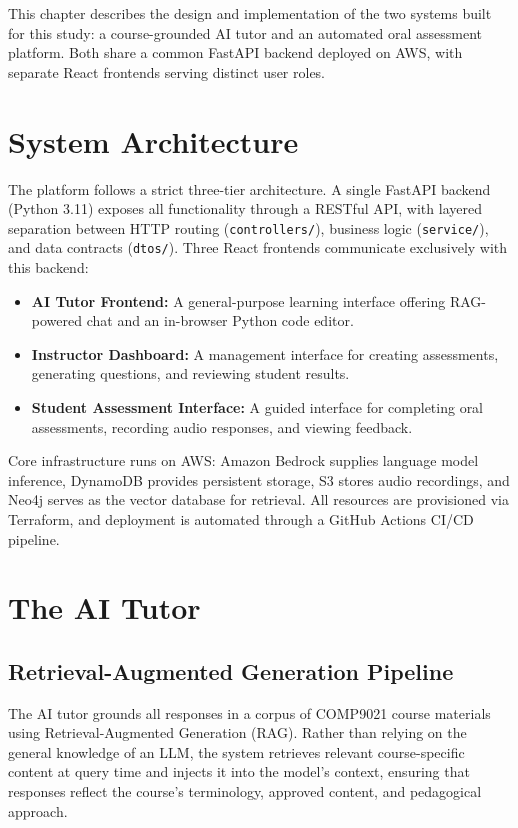 This chapter describes the design and implementation of the two systems built for this study: a course-grounded AI tutor and an automated oral assessment platform. Both share a common FastAPI backend deployed on AWS, with separate React frontends serving distinct user roles.

\section{System Architecture}

The platform follows a strict three-tier architecture. A single FastAPI backend (Python 3.11) exposes all functionality through a RESTful API, with layered separation between HTTP routing (\texttt{controllers/}), business logic (\texttt{service/}), and data contracts (\texttt{dtos/}). Three React frontends communicate exclusively with this backend:

\begin{itemize}
    \item \textbf{AI Tutor Frontend:} A general-purpose learning interface offering RAG-powered chat and an in-browser Python code editor.
    \item \textbf{Instructor Dashboard:} A management interface for creating assessments, generating questions, and reviewing student results.
    \item \textbf{Student Assessment Interface:} A guided interface for completing oral assessments, recording audio responses, and viewing feedback.
\end{itemize}

Core infrastructure runs on AWS: Amazon Bedrock supplies language model inference, DynamoDB provides persistent storage, S3 stores audio recordings, and Neo4j serves as the vector database for retrieval. All resources are provisioned via Terraform, and deployment is automated through a GitHub Actions CI/CD pipeline.

\section{The AI Tutor}

\subsection{Retrieval-Augmented Generation Pipeline}

The AI tutor grounds all responses in a corpus of COMP9021 course materials using Retrieval-Augmented Generation (RAG). Rather than relying on the general knowledge of an LLM, the system retrieves relevant course-specific content at query time and injects it into the model's context, ensuring that responses reflect the course's terminology, approved content, and pedagogical approach.

